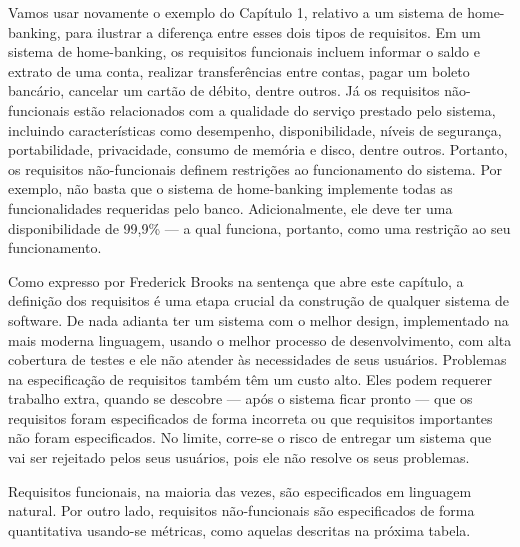 \documentclass[
  11pt,
  twoside]{book}
\begin{document}
 Vamos usar novamente o exemplo do
Capítulo 1, relativo a um sistema de home-banking, para ilustrar a
diferença entre esses dois tipos de requisitos. Em um sistema de
home-banking, os requisitos funcionais incluem informar o saldo e
extrato de uma conta, realizar transferências entre contas, pagar um
boleto bancário, cancelar um cartão de débito, dentre outros. Já os
requisitos não-funcionais estão relacionados com a qualidade do serviço
prestado pelo sistema, incluindo características como desempenho,
disponibilidade, níveis de segurança, portabilidade, privacidade,
consumo de memória e disco, dentre outros. Portanto, os requisitos
não-funcionais definem restrições ao funcionamento do sistema. Por
exemplo, não basta que o sistema de home-banking implemente todas as
funcionalidades requeridas pelo banco. Adicionalmente, ele deve ter uma
disponibilidade de 99,9\% --- a qual funciona, portanto, como uma
restrição ao seu funcionamento.

 Como expresso por Frederick Brooks na sentença
que abre este capítulo, a definição dos requisitos é uma etapa crucial
da construção de qualquer sistema de software. De nada adianta ter um
sistema com o melhor design, implementado na mais moderna linguagem,
usando o melhor processo de desenvolvimento, com alta cobertura de
testes e ele não atender às necessidades de seus usuários. Problemas na
especificação de requisitos também têm um custo alto. Eles podem
requerer trabalho extra, quando se descobre --- após o sistema ficar
pronto --- que os requisitos foram especificados de forma incorreta ou
que requisitos importantes não foram especificados. No limite, corre-se
o risco de entregar um sistema que vai ser rejeitado pelos seus
usuários, pois ele não resolve os seus problemas.

Requisitos funcionais, na maioria das vezes, são especificados em
linguagem natural. Por outro lado, requisitos não-funcionais são
especificados de forma quantitativa usando-se métricas, como aquelas
descritas na próxima tabela.
\end{document}
